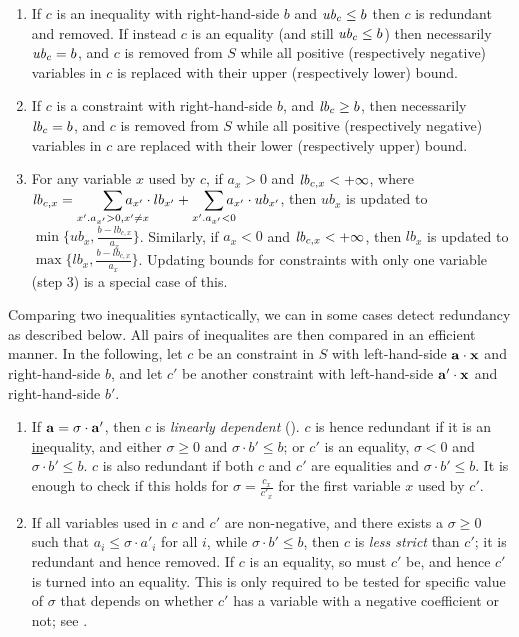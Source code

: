 \begin{enumerate} \itemsep0em
\setcounter{enumi}{\value{counterName}}
	\item If $c$ is an inequality with right-hand-side $b$ and $\mathit{ub}_c \leq b$ then $c$ is redundant and removed. If instead $c$ is an equality (and still $\mathit{ub}_c \leq b$) then necessarily $\mathit{ub}_c = b$, and $c$ is removed from $S$ while all positive (respectively negative) variables in $c$ is replaced with their upper (respectively lower) bound.
	\item If $c$ is a constraint with right-hand-side $b$, and $\mathit{lb}_c \geq b$, then necessarily $\mathit{lb}_c = b$, and $c$ is removed from $S$ while all positive (respectively negative) variables in $c$ are replaced with their lower (respectively upper) bound.
	\item For any variable $x$ used by $c$, if $a_x > 0$ and $\mathit{lb}_{c,x}<+\infty$, 
	where $\mi{lb}_{c,x} = \smashoperator[r]{\sum_{x'.a_{x'}>0, x'\neq x}}a_{x'}\cdot lb_{x'} + \smashoperator[r]{\sum_{x'.a_{x'}<0}}a_{x'}\cdot ub_{x'}$, 
	then $ub_x$ is updated to $\min\{ub_x, \frac{b-\mathit{lb}_{c,x}}{a_x}\}$. 
	Similarly, if $a_x < 0$ and $\mathit{lb}_{c,x}<+\infty$, then $lb_x$ is updated to $\max\{lb_x, \frac{b-\mathit{lb}_{c,x}}{a_x}\}$.	
	Updating bounds for constraints with only one variable (step 3) is a special case of this.
\setcounter{counterName}{\value{enumi}}
\end{enumerate}	
%
Comparing two inequalities syntactically, we can in some cases detect redundancy as described below. All pairs of inequalites are then compared in an efficient manner.
In the following, let $c$ be an constraint in $S$ with left-hand-side $\mathbf{a}\cdot \mathbf{x}$ and right-hand-side $b$, and let $c'$ be another constraint with left-hand-side $\mathbf{a}'\cdot \mathbf{x}$ and right-hand-side $b'$. 
\begin{enumerate} \itemsep0em
\setcounter{enumi}{\value{counterName}}
\item 
If $\mathbf{a}=\sigma\cdot \mathbf{a}'$, then $c$ is \emph{linearly dependent} (\cite{lassez93}). $c$ is hence redundant if
it is an \underline{in}equality, and either $\sigma\geq 0$ and $\sigma\cdot b'\leq b$; or $c'$ is an equality, $\sigma<0$ and $\sigma\cdot b'\leq b$. $c$ is also redundant if both $c$ and $c'$ are equalities and $\sigma\cdot b'\leq b$. 
It is enough to check if this holds for $\sigma = \frac{c_x}{c'_x}$ for the first variable $x$ used by $c'$.
\item
If all variables used in $c$ and $c'$ are non-negative, and there exists a $\sigma\geq 0$ such that $a_i \leq \sigma \cdot a'_i$ for all $i$, while $\sigma\cdot b' \leq b$, then $c$ is \emph{less strict} than $c'$; it is redundant and hence removed. If $c$ is an equality, so must $c'$ be, and hence $c'$ is turned into an equality. 
This is only required to be tested for specific value of $\sigma$ that depends on whether $c'$ has a variable with a negative coefficient or not; see \cite{MyTechRep}.
\end{enumerate} 
%